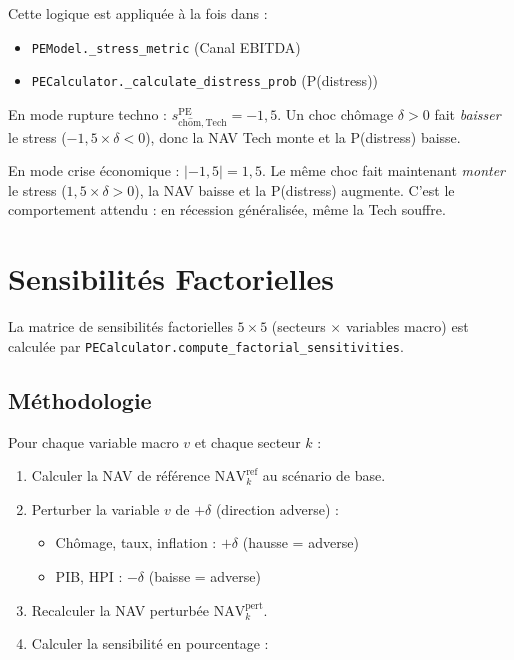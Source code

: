 \documentclass[12pt,a4paper]{article}
\begin{document}
Cette logique est appliqu\'{e}e \`{a} la fois dans :
\begin{itemize}[nosep]
    \item \texttt{PEModel.\_stress\_metric} (Canal EBITDA)
    \item \texttt{PECalculator.\_calculate\_distress\_prob} (P(distress))
\end{itemize}

\begin{interpretbox}
En mode rupture techno : $s_{\mathrm{ch\hat{o}m,Tech}}^{\mathrm{PE}} = -1{,}5$.
Un choc ch\^{o}mage $\delta > 0$ fait \textit{baisser} le stress ($-1{,}5 \times \delta < 0$),
donc la NAV Tech monte et la P(distress) baisse.

En mode crise \'{e}conomique : $|{-1{,}5}| = 1{,}5$.
Le m\^{e}me choc fait maintenant \textit{monter} le stress ($1{,}5 \times \delta > 0$),
la NAV baisse et la P(distress) augmente. C'est le comportement attendu :
en r\'{e}cession g\'{e}n\'{e}ralis\'{e}e, m\^{e}me la Tech souffre.
\end{interpretbox}


\section{Sensibilit\'{e}s Factorielles}
\label{sec:sensitivities}

La matrice de sensibilit\'{e}s factorielles $5 \times 5$ (secteurs $\times$ variables macro)
est calcul\'{e}e par \texttt{PECalculator.compute\_factorial\_sensitivities}.

\subsection{M\'{e}thodologie}

Pour chaque variable macro $v$ et chaque secteur $k$ :

\begin{enumerate}
    \item Calculer la NAV de r\'{e}f\'{e}rence $\mathrm{NAV}_k^{\mathrm{ref}}$ au sc\'{e}nario de base.
    \item Perturber la variable $v$ de $+\delta$ (direction adverse) :
        \begin{itemize}[nosep]
            \item Ch\^{o}mage, taux, inflation : $+\delta$ (hausse = adverse)
            \item PIB, HPI : $-\delta$ (baisse = adverse)
        \end{itemize}
    \item Recalculer la NAV perturb\'{e}e $\mathrm{NAV}_k^{\mathrm{pert}}$.
    \item Calculer la sensibilit\'{e} en pourcentage :
\end{enumerate}
\end{document}
